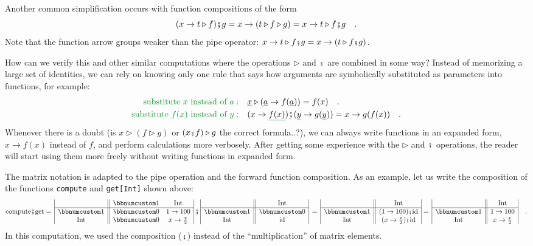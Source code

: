 Another common simplification occurs with function compositions of
the form
\[
(x\rightarrow t\triangleright f)\bef g=x\rightarrow(t\triangleright f\triangleright g)=x\rightarrow t\triangleright f\bef g\quad.
\]
Note that the function arrow groups weaker than the pipe operator:
$x\rightarrow t\triangleright f\bef g=x\rightarrow(t\triangleright f\bef g)$.

How can we verify this and other similar computations where the operations
$\triangleright$ and $\bef$ are combined in some way? Instead of
memorizing a large set of identities, we can rely on knowing only
one rule that says how arguments are symbolically substituted as parameters
into functions, for example:
\begin{align*}
{\color{greenunder}\text{substitute }x\text{ instead of }a:}\quad & \gunderline x\triangleright(\gunderline a\rightarrow f(\gunderline a))=f(x)\quad.\\
{\color{greenunder}\text{substitute }f(x)\text{ instead of }y:}\quad & (x\rightarrow\gunderline{f(x)})\bef(\gunderline y\rightarrow g(\gunderline y))=x\rightarrow g(f(x))\quad.
\end{align*}
Whenever there is a doubt (is $x\triangleright(f\triangleright g)$
or $(x\bef f)\triangleright g$ the correct formula..?), we can always
write functions in an expanded form, $x\rightarrow f(x)$ instead
of $f$, and perform calculations more verbosely. After getting some
experience with the $\triangleright$ and $\bef$ operations, the
reader will start using them more freely without writing functions
in expanded form.

The matrix notation is adapted to the pipe operation and the forward
function composition. As an example, let us write the composition
of the functions \lstinline!compute! and \lstinline!get[Int]! shown
above: 
\[
\text{compute}\bef\text{get}=\,\begin{array}{|c||cc|}
 & \bbnum 1 & \text{Int}\\
\hline \bbnum 1 & \bbnum 0 & 1\rightarrow100\\
\text{Int} & \bbnum 0 & x\rightarrow\frac{x}{2}
\end{array}\,\bef\,\begin{array}{|c||c|}
 & \text{Int}\\
\hline \bbnum 1 & \bbnum 0\\
\text{Int} & \text{id}
\end{array}\,=\,\begin{array}{|c||c|}
 & \text{Int}\\
\hline \bbnum 1 & (1\rightarrow100)\bef\text{id}\\
\text{Int} & (x\rightarrow\frac{x}{2})\bef\text{id}
\end{array}=\,\begin{array}{|c||c|}
 & \text{Int}\\
\hline \bbnum 1 & 1\rightarrow100\\
\text{Int} & x\rightarrow\frac{x}{2}
\end{array}\quad.
\]
In this computation, we used the composition ($\bef$) instead of
the \textsf{``}multiplication\textsf{''} of matrix elements.

